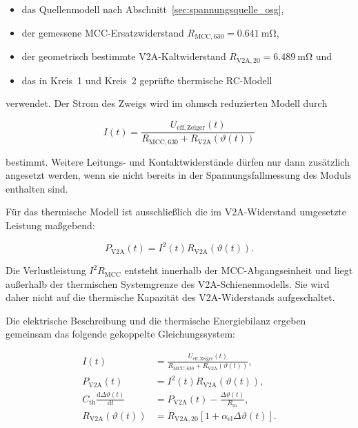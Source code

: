\begin{itemize}
    \item das Quellenmodell nach Abschnitt~\ref{sec:spannungsquelle_osg},
    \item der gemessene MCC-Ersatzwiderstand
          \(R_\mathrm{MCC,630}=\SI{0.641}{\milli\ohm}\),
    \item der geometrisch bestimmte V2A-Kaltwiderstand
          \(R_\mathrm{V2A,20}=\SI{6.489}{\milli\ohm}\) und
    \item das in Kreis~1 und Kreis~2 geprüfte thermische RC-Modell
\end{itemize}

verwendet. Der Strom des Zweigs wird im ohmsch reduzierten Modell durch

\begin{equation}
    I(t)
    =
    \frac{U_\mathrm{eff,Zeiger}(t)}
    {R_\mathrm{MCC,630}+R_\mathrm{V2A}(\vartheta(t))}
    \label{eq:kap5_gesamtmodell_strom}
\end{equation}

bestimmt. Weitere Leitungs- und Kontaktwiderstände dürfen nur dann zusätzlich
angesetzt werden, wenn sie nicht bereits in der Spannungsfallmessung des
Moduls enthalten sind.

Für das thermische Modell ist ausschließlich die im V2A-Widerstand
umgesetzte Leistung maßgebend:

\begin{equation}
    P_\mathrm{V2A}(t)
    =
    I^2(t)R_\mathrm{V2A}(\vartheta(t)).
    \label{eq:kap5_gesamtmodell_pv2a}
\end{equation}

Die Verlustleistung
\(I^2R_\mathrm{MCC}\) entsteht innerhalb der MCC-Abgangseinheit und liegt
außerhalb der thermischen Systemgrenze des V2A-Schienenmodells. Sie wird daher
nicht auf die thermische Kapazität des V2A-Widerstands aufgeschaltet.

Die elektrische Beschreibung und die thermische Energiebilanz ergeben
gemeinsam das folgende gekoppelte Gleichungssystem:

\begin{align}
    I(t)
    &=
    \frac{U_\mathrm{eff,Zeiger}(t)}
    {R_\mathrm{MCC,630}+R_\mathrm{V2A}(\vartheta(t))},
    \\
    P_\mathrm{V2A}(t)
    &=
    I^2(t)R_\mathrm{V2A}(\vartheta(t)),
    \\
    C_\mathrm{th}\frac{\mathrm{d}\Delta\vartheta(t)}{\mathrm{d}t}
    &=
    P_\mathrm{V2A}(t)
    -
    \frac{\Delta\vartheta(t)}{R_\mathrm{th}},
    \\
    R_\mathrm{V2A}(\vartheta(t))
    &=
    R_\mathrm{V2A,20}
    \left[1+\alpha_\mathrm{el}\Delta\vartheta(t)\right].
    \label{eq:kap5_gesamtmodell_gekoppelt}
\end{align}

